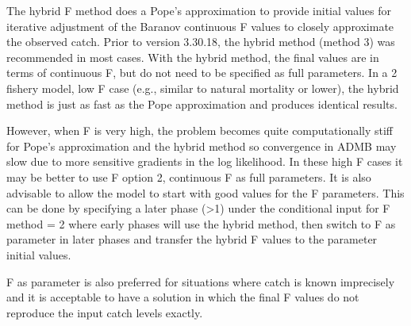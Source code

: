 The hybrid F method does a Pope's approximation to provide initial values for iterative adjustment of the Baranov continuous F values to closely approximate the observed catch.  Prior to version 3.30.18, the hybrid method (method 3) was recommended in most cases. With the hybrid method, the final values are in terms of continuous F, but do not need to be specified as full parameters. In a 2 fishery model, low F case (e.g., similar to natural mortality or lower), the hybrid method is just as fast as the Pope approximation and produces identical results. 

However, when F is very high, the problem becomes quite computationally stiff for Pope's approximation and the hybrid method so convergence in ADMB may slow due to more sensitive gradients in the log likelihood. In these high F cases it may  be better to use F option 2, continuous F as full parameters. It is also advisable to allow the model to start with good values for the F parameters.  This can be done by specifying a later phase (>1) under the conditional input for F method = 2 where early phases will use the hybrid method, then switch to F as parameter in later phases and transfer the hybrid F values to the parameter initial values.

F as parameter is also preferred for situations where catch is known imprecisely and it is acceptable to have a solution in which the final F values do not reproduce the input catch levels exactly. 

